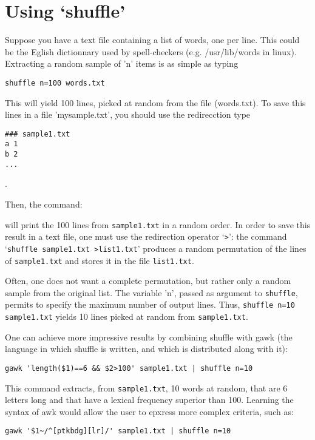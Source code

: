 \documentclass[doc]{apa}
\newcommand{\shuffle}{\texttt{shuffle}}
\begin{document}
\section*{Using `shuffle'}

Suppose you have a text file containing a list of words, one per line.
This could be the Eglish dictionnary used by spell-checkers (e.g.
/usr/lib/words in linux). Extracting a random sample of 'n' items is
as simple as typing

\begin{verbatim}
shuffle n=100 words.txt 
\end{verbatim}  

This will yield 100 lines, picked at random from the file (words.txt).
To save this lines in a file 'mysample.txt', you should use the redirecction type 



\begin{verbatim}
### sample1.txt
a 1 
b 2
...
\end{verbatim}. 
 
Then, the command:


will print the 100 lines from \verb|sample1.txt| in a random order. In
order to save this result in a text file, one must use the redirection
operator `\verb|>|': the command `\verb|shuffle sample1.txt >list1.txt|' produces a random permutation of the lines of
\verb|sample1.txt| and stores it in the file \verb|list1.txt|.

Often, one does not want a complete permutation, but rather only a
random sample from the original list. The variable 'n', passed as
argument to \shuffle{}, permits to specify the maximum number of
output lines. Thus, \verb|shuffle n=10 sample1.txt| yields 10 lines picked at random from \verb|sample1.txt|.

One can achieve more impressive results by combining shuffle with gawk
(the language in which shuffle is written, and which is distributed
along with it):

\begin{verbatim}
gawk 'length($1)==6 && $2>100' sample1.txt | shuffle n=10
\end{verbatim}

This command extracts, from \verb|sample1.txt|, 10 words at random,
that are 6 letters long and that have a lexical frequency superior
than 100. Learning the syntax of awk would allow the user to epxress
more complex criteria, such as:

\begin{verbatim}
gawk '$1~/^[ptkbdg][lr]/' sample1.txt | shuffle n=10
\end{verbatim}
\end{document}
